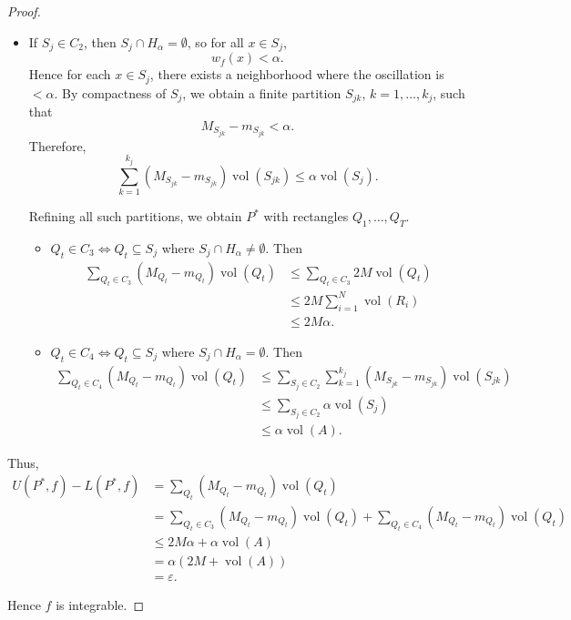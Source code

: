 \documentclass[11pt,openany]{book}
\theoremstyle{plain}
\theoremstyle{definition}
\theoremstyle{remark}
\newcommand{\vol}{\operatorname{vol}}
\begin{document}
\begin{proof}
\begin{itemize}
    \item If $S_j \in C_2$, then $S_j \cap H_\alpha = \emptyset$, so for all $x \in S_j$,
    \[
    w_f(x) < \alpha.
    \]
    Hence for each $x \in S_j$, there exists a neighborhood where the oscillation is $< \alpha$. By compactness of $S_j$, we obtain a finite partition $S_{jk}$, $k=1,\dots,k_j$, such that
    \[
    M_{S_{jk}} - m_{S_{jk}} < \alpha.
    \]
    Therefore,
    \[
    \sum_{k=1}^{k_j} (M_{S_{jk}} - m_{S_{jk}})\vol(S_{jk})
    \le \alpha \vol(S_j).
    \]

    Refining all such partitions, we obtain $P^*$ with rectangles $Q_1,\dots,Q_T$.

    \begin{itemize}
        \item $Q_t \in C_3 \iff Q_t \subseteq S_j$ where $S_j \cap H_\alpha \ne \emptyset$. Then
        \begin{align*}
        \sum_{Q_t \in C_3}(M_{Q_t} - m_{Q_t})\vol(Q_t)
        &\le \sum_{Q_t \in C_3} 2M \vol(Q_t) \\
        &\le 2M \sum_{i=1}^N \vol(R_i) \\
        &\le 2M \alpha.
        \end{align*}

        \item $Q_t \in C_4 \iff Q_t \subseteq S_j$ where $S_j \cap H_\alpha = \emptyset$. Then
        \begin{align*}
        \sum_{Q_t \in C_4}(M_{Q_t} - m_{Q_t}) \vol(Q_t)
        &\le \sum_{S_j \in C_2} \sum_{k=1}^{k_j} (M_{S_{jk}} - m_{S_{jk}})\vol(S_{jk}) \\
        &\le \sum_{S_j \in C_2} \alpha \vol(S_j) \\
        &\le \alpha \vol(A).
        \end{align*}
    \end{itemize}
\end{itemize}

Thus,
\begin{align*}
U(P^*,f) - L(P^*,f)
&= \sum_{Q_t}(M_{Q_t} - m_{Q_t})\vol(Q_t) \\
&= \sum_{Q_t \in C_3}(M_{Q_t} - m_{Q_t})\vol(Q_t)
+ \sum_{Q_t \in C_4}(M_{Q_t} - m_{Q_t})\vol(Q_t) \\
&\le 2M\alpha + \alpha \vol(A) \\
&= \alpha(2M + \vol(A)) \\
&= \varepsilon.
\end{align*}

Hence $f$ is integrable.
\end{proof}
\end{document}
